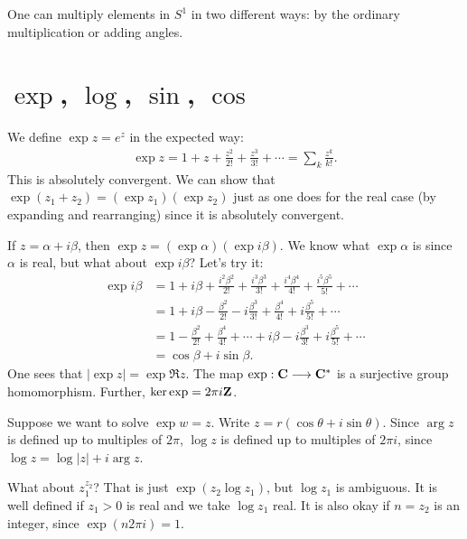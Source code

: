 \documentclass[11pt, oneside,margin=1in]{article}
\begin{document}
One can multiply elements in $S^1$ in two different ways: by the ordinary multiplication or adding angles.\fi
\section{\texorpdfstring{$\exp$}{exp}, \texorpdfstring{$\log$}{log}, \texorpdfstring{$\sin$}{sin}, \texorpdfstring{$\cos$}{cos}}
We define $\exp z = e^z$ in the expected way: \begin{align*}
	\exp z = 1 + z + \frac{z^2}{2!} + \frac{z^3}{3!}+\cdots = \sum_{k}^{} \frac{z^k}{k!} .
\end{align*}
This is absolutely convergent. We can show that $\exp (z_1 + z_2) =(\exp z_1) (\exp z_2)$ just as one does for the real case (by expanding and rearranging) since it is absolutely convergent.

If $z= \alpha+i\beta$, then $\exp z = (\exp \alpha) (\exp i\beta)$. We know what $\exp \alpha$ is since $\alpha$ is real, but what about $\exp i\beta$? Let's try it:
\begin{align*}
	\exp i\beta &= 1 + i\beta + \frac{i^2\beta^2}{2!} + \frac{i^3\beta^3}{3!} + \frac{i^4\beta^4}{4!} + \frac{i^5\beta^5}{5!} + \cdots\\
		    &= 1 + i\beta - \frac{\beta^2}{2!} - i \frac{\beta^3}{3!} + \frac{\beta^4}{4!} + i \frac{\beta^5}{5!} + \cdots\\
		    &= 1 - \frac{\beta^2}{2!} + \frac{\beta^4}{4!} +\cdots + i\beta - i \frac{\beta^3}{3!} + i\frac{\beta^5}{5!} + \cdots\\
		    &= \cos \beta + i \sin \beta.
\end{align*}
One sees that $\left\lvert \exp z \right\rvert = \exp \Re z$. The map $\exp : \mathbf C \longrightarrow \mathbf C^*$ is a surjective group homomorphism. Further, $\ker \exp = 2\pi i\mathbf Z$.

Suppose we want to solve $\exp w = z$. Write $z = r(\cos\theta + i\sin\theta)$. Since $\arg z$ is defined up to multiples of $2\pi$, $\log z$ is defined up to multiples of $2\pi i$, since $\log z = \log \left\lvert z \right\rvert + i\arg z$. 

What about $z_1^{z_2}$? That is just $\exp(z_2\log z_1)$, but $\log z_1$ is ambiguous. It is well defined if $z_1>0$ is real and we take $\log z_1$ real. It is also okay if $n=z_2$ is an integer, since $\exp(n 2\pi i)=1$.
\end{document}
